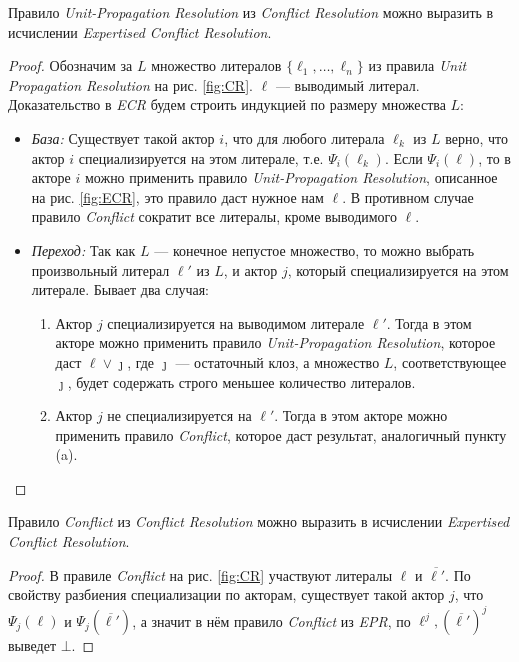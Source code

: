 \begin{lemma}
\label{lem:upr}
Правило \emph{Unit-Propagation Resolution} из \emph{Conflict Resolution} можно выразить в исчислении \emph{Expertised Conflict Resolution}.
\end{lemma}
\begin{proof}
Обозначим за $L$ множество литералов $\{\ell_1, \ldots, \ell_n\}$ из правила \emph{Unit Propagation Resolution} на рис. \ref{fig:CR}. $\ell$ --- выводимый литерал.
Доказательство в \emph{ECR} будем строить индукцией по размеру множества $L$:
\begin{itemize}[label=$\star$]
	\item \emph{База:} Существует такой актор $i$, что для любого литерала $\ell_k$ из $L$ верно, что актор $i$ специализируется на этом литерале, т.е. $\Psi_i(\ell_k)$. Если $\Psi_i(\ell)$, то в акторе $i$ можно применить правило \emph{Unit-Propagation Resolution}, описанное на рис. \ref{fig:ECR}, это правило даст нужное нам $\ell$. В противном случае правило \emph{Conflict} сократит все литералы, кроме выводимого $\ell$.
    \item \emph{Переход:} Так как $L$ --- конечное непустое множество, то можно выбрать произвольный литерал $\ell'$ из $L$, и актор $j$, который специализируется на этом литерале. Бывает два случая:
    \begin{enumerate}
    	\item Актор $j$ специализируется на выводимом литерале $\ell'$. Тогда в этом акторе можно применить правило \emph{Unit-Propagation Resolution}, которое даст $\ell \vee \jmath$, где $\jmath$ --- остаточный клоз, а множество $L$, соответствующее $\jmath$, будет содержать строго меньшее количество литералов.
        \item Актор $j$ не специализируется на $\ell'$. Тогда в этом акторе можно применить правило \emph{Conflict}, которое даст результат, аналогичный пункту (a).
    \end{enumerate} 
\end{itemize}
\end{proof}

\begin{lemma}
\label{lem:confl}
Правило \emph{Conflict} из \emph{Conflict Resolution} можно выразить в исчислении \emph{Expertised Conflict Resolution}.
\end{lemma}
\begin{proof}
В правиле \emph{Conflict} на рис. \ref{fig:CR} участвуют литералы $\ell$ и $\overline{\ell'}$. По свойству разбиения специализации по акторам, существует такой актор $j$, что $\Psi_j(\ell)$ и $\Psi_j(\overline{\ell'})$, а значит в нём правило \emph{Conflict} из \emph{EPR}, по $\ell^j, (\overline{\ell'})^j$ выведет $\bot$.
\end{proof}

